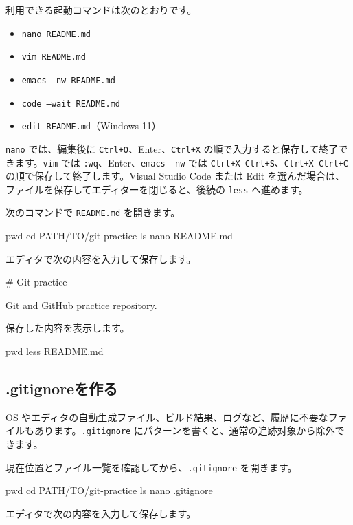 \documentclass[a4paper,11pt]{jlreq}
\newcommand{\cmd}[1]{\texttt{#1}}
\begin{document}
利用できる起動コマンドは次のとおりです。

\begin{itemize}
  \item \cmd{nano README.md}
  \item \cmd{vim README.md}
  \item \cmd{emacs -nw README.md}
  \item \cmd{code --wait README.md}
  \item \cmd{edit README.md}（Windows 11）
\end{itemize}

\cmd{nano} では、編集後に \cmd{Ctrl+O}、Enter、\cmd{Ctrl+X} の順で入力すると保存して終了できます。\cmd{vim} では \cmd{:wq}、Enter、\cmd{emacs -nw} では \cmd{Ctrl+X Ctrl+S}、\cmd{Ctrl+X Ctrl+C} の順で保存して終了します。Visual Studio Code または Edit を選んだ場合は、ファイルを保存してエディターを閉じると、後続の \cmd{less} へ進めます。

次のコマンドで \cmd{README.md} を開きます。

\begin{codeblock}
pwd
cd PATH/TO/git-practice
ls
nano README.md
\end{codeblock}

エディタで次の内容を入力して保存します。

\begin{codeblock}
# Git practice

Git and GitHub practice repository.
\end{codeblock}

保存した内容を表示します。

\begin{codeblock}
pwd
less README.md
\end{codeblock}

\subsection{.gitignoreを作る}

OS やエディタの自動生成ファイル、ビルド結果、ログなど、履歴に不要なファイルもあります。\cmd{.gitignore} にパターンを書くと、通常の追跡対象から除外できます。

現在位置とファイル一覧を確認してから、\cmd{.gitignore} を開きます。

\begin{codeblock}
pwd
cd PATH/TO/git-practice
ls
nano .gitignore
\end{codeblock}

エディタで次の内容を入力して保存します。
\end{document}

